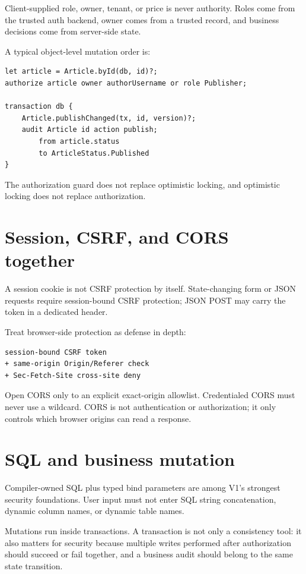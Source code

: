 Client-supplied role, owner, tenant, or price is never authority. Roles come from the trusted auth backend, owner comes from a trusted record, and business decisions come from server-side state.

\Needspace{0.38\textheight}
A typical object-level mutation order is:

\begin{lstlisting}[language=RWLang]
let article = Article.byId(db, id)?;
authorize article owner authorUsername or role Publisher;

transaction db {
    Article.publishChanged(tx, id, version)?;
    audit Article id action publish;
        from article.status
        to ArticleStatus.Published
}
\end{lstlisting}

The authorization guard does not replace optimistic locking, and optimistic locking does not replace authorization.

\section{Session, CSRF, and CORS together}

A session cookie is not CSRF protection by itself. State-changing form or JSON requests require session-bound CSRF protection; JSON POST may carry the token in a dedicated header.

Treat browser-side protection as defense in depth:

\begin{lstlisting}
session-bound CSRF token
+ same-origin Origin/Referer check
+ Sec-Fetch-Site cross-site deny
\end{lstlisting}

Open CORS only to an explicit exact-origin allowlist. Credentialed CORS must never use a wildcard. CORS is not authentication or authorization; it only controls which browser origins can read a response.

\section{SQL and business mutation}

Compiler-owned SQL plus typed bind parameters are among V1's strongest security foundations. User input must not enter SQL string concatenation, dynamic column names, or dynamic table names.

Mutations run inside transactions. A transaction is not only a consistency tool: it also matters for security because multiple writes performed after authorization should succeed or fail together, and a business audit should belong to the same state transition.

